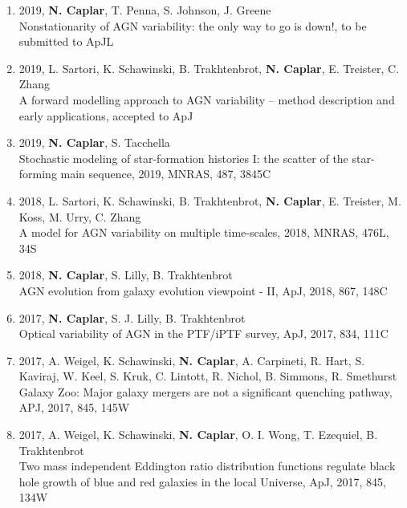 \documentclass[11pt,letterpaper]{article}
\begin{document}
\begin{enumerate}



\item 2019, \textbf{N. Caplar}, T. Penna, S. Johnson, J. Greene \\
Nonstationarity of AGN variability: the only way to go is down!, to be submitted to ApJL\\

\item 2019, L. Sartori, K. Schawinski, B. Trakhtenbrot, \textbf{N. Caplar}, E. Treister, C. Zhang\\
A forward modelling approach to AGN variability – method
description and early applications, accepted to ApJ\\

\item 2019, \textbf{N. Caplar}, S. Tacchella \\
Stochastic modeling of star-formation histories I: the scatter of the star-forming main sequence, 2019, MNRAS, 487, 3845C\\


\item 2018, L. Sartori, K. Schawinski, B. Trakhtenbrot, \textbf{N. Caplar}, E. Treister, M. Koss, M. Urry, C. Zhang \\
A model for AGN variability on multiple time-scales, 2018, MNRAS, 476L, 34S\\

\item 2018, \textbf{N. Caplar}, S. Lilly, B. Trakhtenbrot\\
AGN evolution from galaxy evolution viewpoint - II, ApJ, 2018, 867, 148C\\

\item 2017,  \textbf{N. Caplar}, S. J. Lilly, B. Trakhtenbrot   \\Optical variability of AGN in the PTF/iPTF survey, ApJ, 2017, 834, 111C   \\

\item 2017, A. Weigel, K. Schawinski,  \textbf{N. Caplar}, A. Carpineti, R. Hart, S. Kaviraj, W. Keel, S. Kruk, C. Lintott, R. Nichol, B. Simmons, R. Smethurst
\\    Galaxy Zoo:  Major galaxy mergers are not a significant quenching pathway, APJ, 2017, 845, 145W \\

\item 2017, A. Weigel, K. Schawinski,  \textbf{N. Caplar}, O. I. Wong, T. Ezequiel, B. Trakhtenbrot
\\    Two mass independent Eddington ratio distribution functions regulate black hole growth of blue and red 
galaxies in the local Universe, ApJ, 2017, 845, 134W \\



\end{enumerate}
\end{document}

